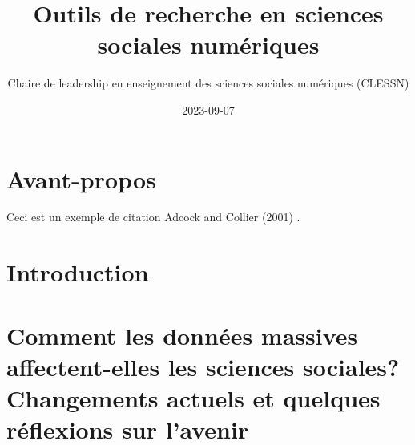 \documentclass[
  letterpaper,
]{scrbook}
\title{Outils de recherche en sciences sociales numériques}
\author{Chaire de leadership en enseignement des sciences sociales
numériques (CLESSN)}
\date{2023-09-07}
\renewcommand*\contentsname{Table of contents}
\newcommand\contentsname{Table of contents}
\begin{document}
\frontmatter
\maketitle
\ifdefined\Shaded\renewenvironment{Shaded}{\begin{tcolorbox}[frame hidden, borderline west={3pt}{0pt}{shadecolor}, interior hidden, sharp corners, enhanced, breakable, boxrule=0pt]}{\end{tcolorbox}}\fi

\renewcommand*\contentsname{Table of contents}
{
\setcounter{tocdepth}{2}
\tableofcontents
}
\mainmatter
{}

\hypertarget{avant-propos}{%
\chapter*{Avant-propos}\label{avant-propos}}


Ceci est un exemple de citation Adcock and Collier (2001) .


\hypertarget{introduction}{%
\chapter*{Introduction}\label{introduction}}



\hypertarget{comment-les-donnuxe9es-massives-affectent-elles-les-sciences-sociales-changements-actuels-et-quelques-ruxe9flexions-sur-lavenir}{%
\chapter{Comment les données massives affectent-elles les sciences
sociales? Changements actuels et quelques réflexions sur
l'avenir}\label{comment-les-donnuxe9es-massives-affectent-elles-les-sciences-sociales-changements-actuels-et-quelques-ruxe9flexions-sur-lavenir}}
\end{document}
